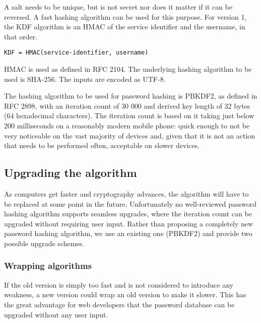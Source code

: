 \documentclass{paper}
\newcommand{\code}[1]{\texttt{\colorbox{gray!11}{#1}}}
\begin{document}
A salt needs to be unique, but is not secret nor does it matter if it can be reversed. A fast
hashing algorithm can be used for this purpose. For version 1, the KDF algorithm is an HMAC
of the service identifier and the username, in that order.

\code{KDF = HMAC(service-identifier, username)}

HMAC is used as defined in RFC 2104\footnotemark. The underlying hashing algorithm to be used is SHA-256.
The inputs are encoded as UTF-8.


The hashing algorithm to be used for password hashing is PBKDF2, as defined in RFC
2898\footnotemark, with an iteration count of 30 000 and derived key length of 32 bytes (64
hexadecimal characters). The iteration count is based on it taking just below 200
milliseconds on a reasonably modern mobile phone: quick enough to not be very noticeable on
the vast majority of devices and, given that it is not an action that needs to be performed
often, acceptable on slower devices.


\subsection{Upgrading the algorithm}

As computers get faster and cryptography advances, the algorithm will have to be replaced
at some point in the future. Unfortunately no well-reviewed password hashing algorithm
supports seamless upgrades, where the iteration count can be upgraded without requiring user
input. Rather than proposing a completely new password hashing algorithm, we use an existing
one (PBKDF2) and provide two possible upgrade schemes.

\subsubsection{Wrapping algorithms}

If the old version is simply too fast and is not considered to introduce any weakness, a new
version could wrap an old version to make it slower. This has the great advantage for web
developers that the password database can be upgraded without any user input.
\end{document}
